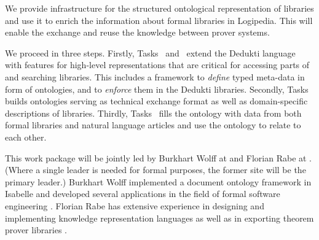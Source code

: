 \begin{workpackage}[id=structuring,type=RTD,
  short={Structure of the encyclopedia},%
  title={Structure of the encyclopedia},
  lead=Sac,
  SacRM=40,
  FauRM=20,
  BolRM=4
]



\begin{wpobjectives}
We provide infrastructure for the structured ontological representation of libraries and use it to enrich the information about formal libraries in Logipedia.
This will enable the exchange and reuse the knowledge between prover systems.
\end{wpobjectives}


\begin{wpdescription}
We proceed in three steps.
Firstly, Tasks~ and~ extend the Dedukti language with features for high-level representations that are critical for accessing parts of and searching libraries.
This includes a framework to \emph{define} typed meta-data in form of ontologies, and to \emph{enforce} them in 
the Dedukti libraries.
Secondly, Tasks~ builds ontologies serving as technical exchange format as well as domain-specific descriptions of libraries.
Thirdly, Tasks~ fills the ontology with data from both formal libraries and natural language articles and use the ontology to relate to each other.

This work package will be jointly led by Burkhart Wolff at  and Florian Rabe at .
(Where a single leader is needed for formal purposes, the former site will be the primary leader.)
Burkhart Wolff implemented a document ontology framework in Isabelle and developed several applications
in the field of formal software engineering \cite{brucker.ea:ontologies-certification:2019,brucker.ea:isabelle-ontologies:2018,brucker.ea:ontologies-certification:2019}.
Florian Rabe has extensive experience in designing and implementing knowledge representation languages \cite{RK:mmt:10,rabe:recon:17} as well as in exporting theorem prover libraries \cite{KR:oafexp:20,CKMRSW:ulo:19}.
\end{wpdescription}


\end{workpackage}
